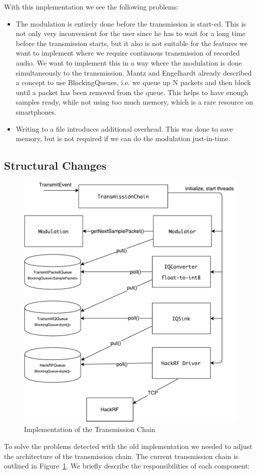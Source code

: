 \pagebreak
With this implementation we see the following problems: 
\begin{itemize}
	\item The modulation is entirely done before the transmission is start-ed. This is not only very inconvenient for the user since he has to wait for a long time before the transmission starts, but it also is not suitable for the features we want to implement where we require continuous transmission of recorded audio. We want to implement this in a way where the modulation is done simultaneously to the transmission. Mantz and Engelhardt \cite{Mantz2016} already described a concept to use BlockingQueues, i.e. we queue up N packets and then block until a packet has been removed from the queue. This helps to have enough samples ready, while not using too much memory, which is a rare resource on smartphones. 
	\item Writing to a file introduces additional overhead. This was done to save memory, but is not required if we can do the modulation just-in-time. 
\end{itemize}

\subsection{Structural Changes}
\begin{figure}[!htbp]
	\centering
	\includegraphics[width=0.8\linewidth]{gfx/feature1_design.pdf}
	\caption{Implementation of the Transmission Chain}
	\label{fig:impl:transmissionchain}
\end{figure}
To solve the problems detected with the old implementation we needed to adjust the architecture of the transmission chain. The current transmission chain is outlined in Figure~\ref{fig:impl:transmissionchain}. We briefly describe the responsibilities of each component: 

